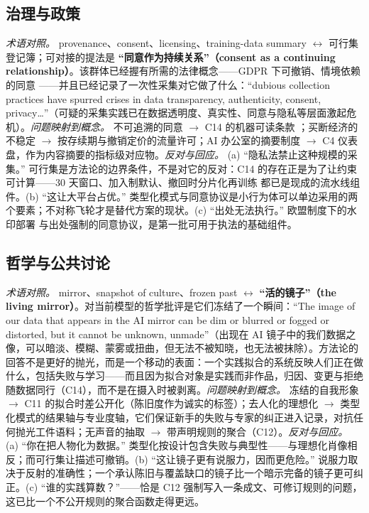 \documentclass[10pt,fontset=fandol]{ctexart}
\begin{document}
\subsection{治理与政策}

\emph{术语对照。} provenance、consent、licensing、training-data summary $\leftrightarrow$ 可行集登记簿；可对接的提法是 \textbf{“同意作为持续关系”（consent as a continuing relationship）}。该群体已经握有所需的法律概念——GDPR 下可撤销、情境依赖的同意 \cite{ref60}——并且已经记录了一次性采集对它做了什么：“dubious collection practices have spurred crises in data transparency, authenticity, consent, privacy…”（可疑的采集实践已在数据透明度、真实性、同意与隐私等层面激起危机）\cite{ref9}。\emph{问题映射到概念。} 不可追溯的同意 $\to$ C14 的机器可读条款 \cite{ref59}；买断经济的不稳定 \cite{ref10,ref63} $\to$ 按存续期与撤销定价的流量许可；AI 办公室的摘要制度 \cite{ref17} $\to$ C4 仪表盘，作为内容摘要的指标级对应物。\emph{反对与回应。} (a) “隐私法禁止这种规模的采集。” 可行集是方法论的边界条件，不是对它的反对：C14 的存在正是为了让约束可计算——30 天窗口、加入制默认、撤回时分片化再训练 \cite{ref61} 都已是现成的流水线组件。(b) “这让大平台占优。” 类型化模式与同意协议是小行为体可以单边采用的两个要素；不对称飞轮才是替代方案的现状。(c) “出处无法执行。” 欧盟制度下的水印部署 \cite{ref42} 与出处强制的同意协议，是第一批可用于执法的基础组件。

\subsection{哲学与公共讨论}

\emph{术语对照。} mirror、snapshot of culture、frozen past $\leftrightarrow$ \textbf{“活的镜子”（the living mirror）}。对当前模型的哲学批评是它们冻结了一个瞬间：“The image of our data that appears in the AI mirror can be dim or blurred or fogged or distorted, but it cannot be unknown, unmade”（出现在 AI 镜子中的我们数据之像，可以暗淡、模糊、蒙雾或扭曲，但无法不被知晓，也无法被抹除）\cite{ref68}。方法论的回答不是更好的抛光，而是一个移动的表面：一个实践拟合的系统反映人们正在做什么，包括失败与学习——而且因为拟合对象是实践而非作品，归因、变更与拒绝随数据同行（C14），而不是在摄入时被剥离。\emph{问题映射到概念。} 冻结的自我形象 $\to$ C11 的拟合时差公开化（陈旧度作为诚实的标签）；去人化的理想化 $\to$ 类型化模式的结果轴与专业度轴，它们保证新手的失败与专家的纠正进入记录，对抗任何抛光工件语料；无声音的抽取 $\to$ 带声明规则的聚合（C12）。\emph{反对与回应。} (a) “你在把人物化为数据。” 类型化按设计包含失败与典型性——与理想化肖像相反；而可行集让描述可撤销。(b) “这让镜子更有说服力，因而更危险。” 说服力取决于反射的准确性；一个承认陈旧与覆盖缺口的镜子比一个暗示完备的镜子更可纠正。(c) “谁的实践算数？”——恰是 C12 强制写入一条成文、可修订规则的问题，这已比一个不公开规则的聚合函数走得更远。
\end{document}
